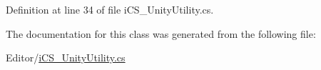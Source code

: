Definition at line 34 of file i\+C\+S\+\_\+\+Unity\+Utility.\+cs.



The documentation for this class was generated from the following file\+:\begin{DoxyCompactItemize}
\item 
Editor/\hyperlink{i_c_s___unity_utility_8cs}{i\+C\+S\+\_\+\+Unity\+Utility.\+cs}\end{DoxyCompactItemize}
